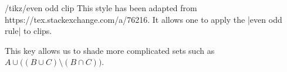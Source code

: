 \documentclass[a4paper]{ltxdoc}
\begin{document}
\begin{key}{/tikz/even odd clip }
        This style has been adapted from https://tex.stackexchange.com/a/76216.
		It allows one to apply the |even odd rule| to clips.
\end{key}

This key allows us to shade more complicated sets such as $A\cup\bigl((B\cup
C)\setminus (B \cap C)\bigr)$.

\begin{codeexample}[width=5cm]
\end{codeexample}
\end{document}

